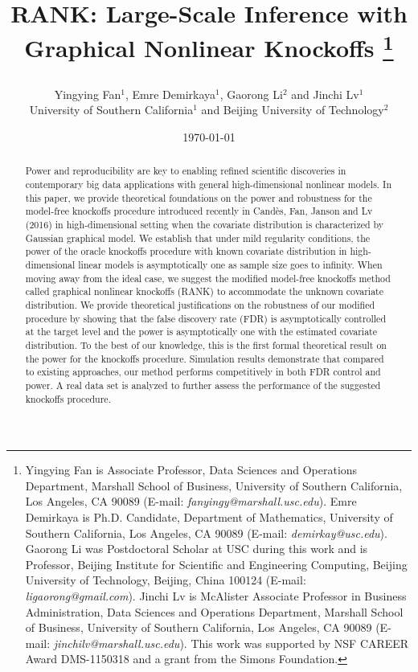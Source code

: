 \documentclass[11pt]{article}
\begin{document}
\title{RANK: Large-Scale Inference with Graphical Nonlinear Knockoffs
\thanks{Yingying Fan is Associate Professor, Data Sciences and Operations Department, Marshall School of Business, University of Southern California, Los Angeles, CA 90089 (E-mail: \textit{fanyingy@marshall.usc.edu}). Emre Demirkaya is Ph.D. Candidate, Department of Mathematics, University of Southern California, Los Angeles, CA 90089 (E-mail: \textit{demirkay@usc.edu}). Gaorong Li was Postdoctoral Scholar at USC during this work and is Professor, Beijing Institute for Scientific and Engineering Computing, Beijing University of Technology, Beijing, China 100124 (E-mail: \textit{ligaorong@gmail.com}). Jinchi Lv is McAlister Associate Professor in Business Administration, Data Sciences and Operations Department, Marshall School of Business, University of Southern California, Los Angeles, CA 90089 (E-mail: \textit{jinchilv@marshall.usc.edu}). This work was supported by NSF CAREER Award DMS-1150318 and a grant from the Simons Foundation.}
\date{\today}
\author{Yingying Fan$^1$, Emre Demirkaya$^1$, Gaorong Li$^2$ and Jinchi Lv$^1$
\medskip\\
University of Southern California$^1$ and Beijing University of Technology$^2$
\\
} %
}

\maketitle

\begin{abstract}
Power and reproducibility are key to enabling refined scientific discoveries in contemporary big data applications with general high-dimensional nonlinear models. In this paper, we provide theoretical foundations on the power and robustness for the model-free knockoffs procedure introduced recently in Cand\`{e}s, Fan, Janson and Lv (2016) in high-dimensional setting when the covariate distribution is characterized by Gaussian graphical model. We establish that under mild regularity conditions, the power of the oracle knockoffs procedure with known covariate distribution in high-dimensional linear models is asymptotically one as sample size goes to infinity.  When moving away from the ideal case, we suggest the modified model-free knockoffs method called graphical nonlinear knockoffs (RANK) to accommodate the unknown covariate distribution. We provide theoretical justifications on the robustness of our modified procedure by showing that the false discovery rate (FDR) is asymptotically controlled at the target level and the power is asymptotically one with the estimated covariate distribution. To the best of our knowledge, this is the first formal theoretical result on the power for the knockoffs procedure. Simulation results demonstrate that compared to existing approaches, our method performs competitively in both FDR control and power. A real data set is analyzed to further assess the performance of the suggested knockoffs procedure.
\end{abstract}
\end{document}
